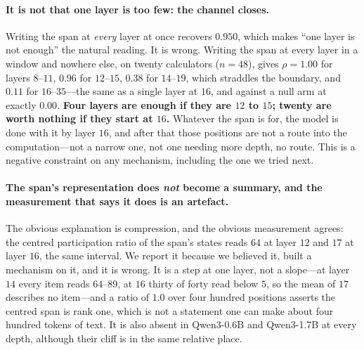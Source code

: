 \documentclass{article}
\begin{document}
\paragraph{It is not that one layer is too few: the channel closes.} Writing the
span at \emph{every} layer at once recovers $0.950$, which makes ``one layer is
not enough'' the natural reading. It is wrong. Writing the span at every layer
in a window and nowhere else, on twenty calculators ($n=48$), gives
$\rho = 1.00$ for layers $8$--$11$, $0.96$ for $12$--$15$, $0.38$ for
$14$--$19$, which straddles the boundary, and $\mathbf{0.11}$ for
$16$--$35$---the same as a single layer at $16$, and against a null arm at
exactly $0.00$. \textbf{Four layers are enough if they are $12$ to $15$; twenty
are worth nothing if they start at $16$.} Whatever the span is for, the model is done with it by layer $16$, and
after that those positions are not a route into the computation---not a narrow
one, not one needing more depth, no route. This is a negative constraint on any
mechanism, including the one we tried next.

\paragraph{The span's representation does \emph{not} become a summary, and the
measurement that says it does is an artefact.} The obvious explanation is
compression, and the obvious measurement agrees: the centred participation ratio
of the span's states reads $64$ at layer $12$ and $17$ at layer $16$, the same
interval. We report it because we believed it, built a mechanism on it, and it
is wrong. It is a step at one layer, not a slope---at layer $14$ every item
reads $64$--$89$, at $16$ thirty of forty read below $5$, so the mean of $17$
describes no item---and a ratio of $1.0$ over four hundred positions asserts the
centred span is rank one, which is not a statement one can make about four
hundred tokens of text. It is also absent in Qwen3-0.6B and Qwen3-1.7B at every
depth, although their cliff is in the same relative place.
\end{document}
